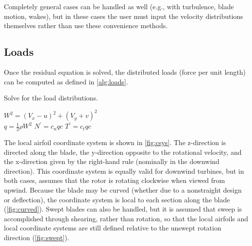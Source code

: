 \documentclass{article}
\begin{document}
Completely general cases can be handled as well (e.g., with turbulence, blade motion, wakes), but in these cases the user must input the velocity distributions themselves rather than use these convenience methods.


\subsection{Loads}

Once the residual equation is solved, the distributed loads (force per unit length) can be computed as defined in \cref{alg:loads}.
\begin{algorithm}[htbp]
\caption{Solve for the load distributions.}
\begin{algorithmic}
\State $W^2 = (V_x - u)^2 + (V_y + v)^2$
\\
\State $q = \frac{1}{2}\rho W^2$
\State $N^\prime = c_n q c$
\State $T^\prime = c_t q c$

\end{algorithmic}
\label{alg:loads}
\end{algorithm}


The local airfoil coordinate system is shown in \cref{fig:csys}.  The z-direction is directed along the blade, the y-direction opposite to the rotational velocity, and the x-direction given by the right-hand rule (nominally in the downwind direction).  This coordinate system is equally valid for downwind turbines, but in both cases, assumes that the rotor is rotating clockwise when viewed from upwind.  Because the blade may be curved (whether due to a nonstraight design or deflection), the coordinate system is local to each section along the blade (\cref{fig:curved}).  Swept blades can also be handled, but it is assumed that sweep is accomplished through shearing, rather than rotation, so that the local airfoils and local coordinate systems are still defined relative to the unswept rotation direction (\cref{fig:swept}).
\end{document}
